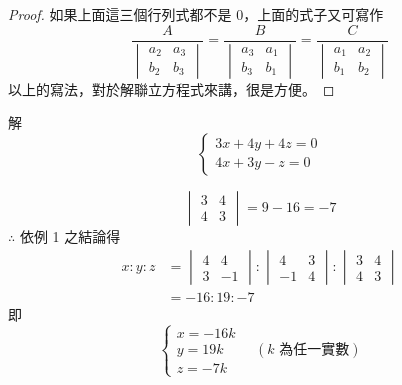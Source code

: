 \begin{proof}
如果上面這三個行列式都不是 $0$，上面的式子又可寫作
\begin{equation*}
  \frac{A}{\begin{vmatrix} a_2 & a_3 \\ b_2 & b_3 \end{vmatrix}} = \frac{B}{\begin{vmatrix} a_3 & a_1 \\ b_3 & b_1 \end{vmatrix}} = \frac{C}{\begin{vmatrix} a_1 & a_2 \\ b_1 & b_2 \end{vmatrix}}
\end{equation*}
以上的寫法，對於解聯立方程式來講，很是方便。
\end{proof}

\begin{example}\label{ex:4-4-4}
解
\begin{equation*}
\begin{cases}
  3x+4y+4z = 0 \\
  4x+3y-z = 0
\end{cases}
\end{equation*}
\end{example}

\begin{solution*}
\begin{equation*}
  \begin{vmatrix} 3 & 4 \\ 4 & 3 \end{vmatrix} = 9 - 16 = -7
\end{equation*}
$\therefore$ 依例 1 之結論得
\begin{align*}
  x : y : z &= \begin{vmatrix} 4 & 4 \\ 3 & -1 \end{vmatrix} : \begin{vmatrix} 4 & 3 \\ -1 & 4 \end{vmatrix} : \begin{vmatrix} 3 & 4 \\ 4 & 3 \end{vmatrix} \\
  &= -16 : 19 : -7
\end{align*}
即
\begin{equation*}
\begin{cases}
  x = -16k \\
  y = 19k \\
  z = -7k
\end{cases}
\quad (k \text{ 為任一實數})
\end{equation*}
\end{solution*}

